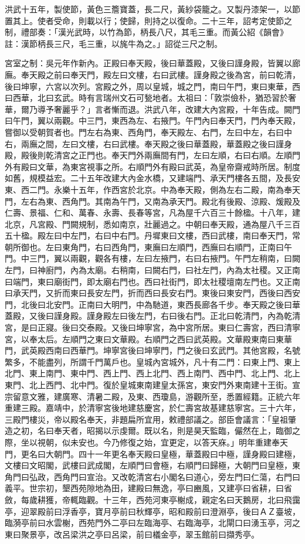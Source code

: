洪武十五年，製使節，黃色三簷寶蓋，長二尺，黃紗袋籠之。又製丹漆架一，以節置其上。使者受命，則載以行；使歸，則持之以復命。二十三年，詔考定使節之制，禮部奏：「漢光武時，以竹為節，柄長八尺，其毛三重。而黃公紹《韻會》註：漢節柄長三尺，毛三重，以旄牛為之。」詔從三尺之制。

宮室之制：吳元年作新內。正殿曰奉天殿，後曰華蓋殿，又後曰謹身殿，皆翼以廊廡。奉天殿之前曰奉天門，殿左曰文樓，右曰武樓。謹身殿之後為宮，前曰乾清，後曰坤寧，六宮以次列。宮殿之外，周以皇城，城之門，南曰午門，東曰東華，西曰西華，北曰玄武。時有言瑞州文石可甃地者。太祖曰：「敦崇儉朴，猶恐習於奢華，爾乃導予奢麗乎？」言者慚而退。洪武八年，改建大內宮殿，十年告成。闕門曰午門，翼以兩觀。中三門，東西為左、右掖門。午門內曰奉天門，門內奉天殿，嘗御以受朝賀者也。門左右為東、西角門，奉天殿左、右門，左曰中左，右曰中右，兩廡之間，左曰文樓，右曰武樓。奉天殿之後曰華蓋殿，華蓋殿之後曰謹身殿，殿後則乾清宮之正門也。奉天門外兩廡間有門，左曰左順，右曰右順。左順門外有殿曰文華，為東宮視事之所。右順門外有殿曰武英，為皇帝齋戒時所居。制度如舊，規模益宏。二十五年改建大內金水橋，又建端門、承天門樓各五間，及長安東、西二門。永樂十五年，作西宮於北京。中為奉天殿，側為左右二殿，南為奉天門，左右為東、西角門。其南為午門，又南為承天門。殿北有後殿、涼殿、煖殿及仁壽、景福、仁和、萬春、永壽、長春等宮，凡為屋千六百三十餘楹。十八年，建北京，凡宮殿、門闕規制，悉如南京，壯麗過之。中朝曰奉天殿，通為屋八千三百五十楹。殿左曰中左門，右曰中右門。丹墀東曰文樓，西曰武樓，南曰奉天門，常朝所御也。左曰東角門，右曰西角門，東廡曰左順門，西廡曰右順門，正南曰午門。中三門，翼以兩觀，觀各有樓，左曰左掖門，右曰右掖門。午門左稍南，曰闕左門，曰神廚門，內為太廟。右稍南，曰闕右門，曰社左門，內為太社稷。又正南曰端門，東曰廟街門，即太廟右門也。西曰社街門，即太社稷壇南左門也。又正南曰承天門，又折而東曰長安左門，折而西曰長安右門。東後曰東安門，西後曰西安門，北後曰北安門。正南曰大明門，中為馳道，東西長廊各千步。奉天殿之後曰華蓋殿，又後曰謹身殿。謹身殿左曰後左門，右曰後右門。正北曰乾清門，內為乾清宮，是曰正寢。後曰交泰殿。又後曰坤寧宮，為中宮所居。東曰仁壽宮，西曰清寧宮，以奉太后。左順門之東曰文華殿。右順門之西曰武英殿。文華殿東南曰東華門，武英殿西南曰西華門。坤寧宮後曰坤寧門，門之後曰玄武門。其他宮殿，名號繁多，不能盡列，所謂千門萬戶也。皇城內宮城外，凡十有二門：曰東上門、東上北門、東上南門、東中門、西上門、西上北門、西上南門、西中門、北上門、北上東門、北上西門、北中門。復於皇城東南建皇太孫宮，東安門外東南建十王街。宣宗留意文雅，建廣寒、清暑二殿，及東、西瓊島，游觀所至，悉置經籍。正統六年重建三殿。嘉靖中，於清寧宮後地建慈慶宮，於仁壽宮故基建慈寧宮。三十六年，三殿門樓災，帝以殿名奉天，非題扁所宜用，敕禮部議之。部臣會議言：「皇祖肇造之初，名曰奉天者，昭揭以示虔爾。既以名，則是昊天監臨，儼然在上，臨御之際，坐以視朝，似未安也。今乃修復之始，宜更定，以答天庥。」明年重建奉天門，更名曰大朝門。四十一年更名奉天殿曰皇極，華蓋殿曰中極，謹身殿曰建極，文樓曰文昭閣，武樓曰武成閣，左順門曰會極，右順門曰歸極，大朝門曰皇極，東角門曰弘政，西角門曰宣治。又改乾清宮右小閣名曰道心，旁左門曰仁蕩，右門曰義平。世宗初，墾西苑隙地為田，建殿曰無逸，亭曰豳風，又建亭曰省耕，曰省斂，每歲耕獲，帝輒臨觀。十三年，西苑河東亭榭成，親定名曰天鵝房，北曰飛靄亭，迎翠殿前曰浮香亭，寶月亭前曰秋輝亭，昭和殿前曰澄淵亭，後曰ＡＺ臺坡，臨漪亭前曰水雲榭，西苑門外二亭曰左臨海亭、右臨海亭，北閘口曰湧玉亭，河之東曰聚景亭，改呂梁洪之亭曰呂梁，前曰檥金亭，翠玉館前曰擷秀亭。

